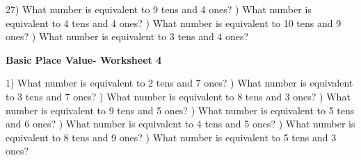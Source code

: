 \documentclass{article}%
\begin{document}
27) What number is equivalent to 9 tens and 4 ones?%
\newline%
\newline%
) What number is equivalent to 4 tens and 4 ones?%
\newline%
\newline%
) What number is equivalent to 10 tens and 9 ones?%
\newline%
\newline%
) What number is equivalent to 3 tens and 4 ones?%
\newline%
\newline%
\newline%
\pagebreak%
\large%
\begin{center}%
\textbf{Basic Place Value- Worksheet 4}%
\newline%
\newline%
\newline%
\end{center} \normalsize%
1) What number is equivalent to 2 tens and 7 ones?%
\newline%
\newline%
) What number is equivalent to 3 tens and 7 ones?%
\newline%
\newline%
) What number is equivalent to 8 tens and 3 ones?%
\newline%
\newline%
) What number is equivalent to 9 tens and 5 ones?%
\newline%
\newline%
) What number is equivalent to 5 tens and 6 ones?%
\newline%
\newline%
) What number is equivalent to 4 tens and 5 ones?%
\newline%
\newline%
) What number is equivalent to 8 tens and 9 ones?%
\newline%
\newline%
) What number is equivalent to 5 tens and 3 ones?%
\end{document}
